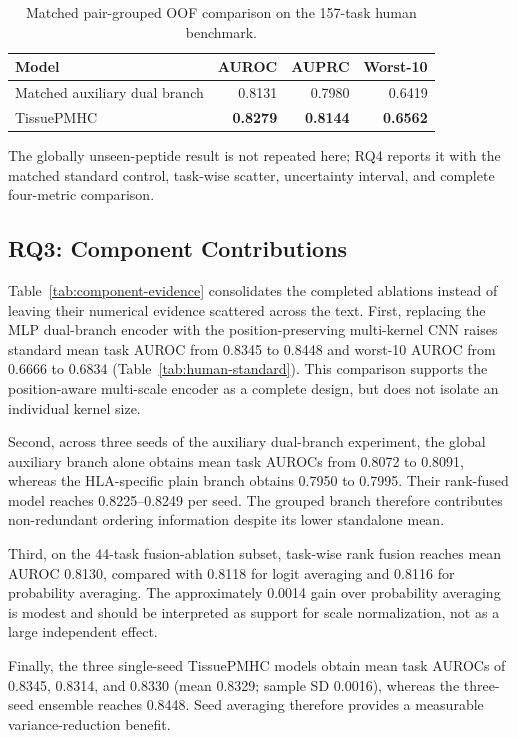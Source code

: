 \begin{table}[tbp]
\centering
\caption{Matched pair-grouped OOF comparison on the 157-task human benchmark.}
\label{tab:human-matched-oof}
\small
\begin{tabular}{lrrr}
\toprule
Model & AUROC & AUPRC & Worst-10 \\ 
\midrule
Matched auxiliary dual branch & 0.8131 & 0.7980 & 0.6419 \\ 
TissuePMHC & \textbf{0.8279} & \textbf{0.8144} & \textbf{0.6562} \\ 
\bottomrule
\end{tabular}
\end{table}

The globally unseen-peptide result is not repeated here; RQ4 reports it with the matched standard control, task-wise scatter, uncertainty interval, and complete four-metric comparison.

\subsection{RQ3: Component Contributions}

Table~\ref{tab:component-evidence} consolidates the completed ablations instead of leaving their numerical evidence scattered across the text. First, replacing the MLP dual-branch encoder with the position-preserving multi-kernel CNN raises standard mean task AUROC from 0.8345 to 0.8448 and worst-10 AUROC from 0.6666 to 0.6834 (Table~\ref{tab:human-standard}). This comparison supports the position-aware multi-scale encoder as a complete design, but does not isolate an individual kernel size.

Second, across three seeds of the auxiliary dual-branch experiment, the global auxiliary branch alone obtains mean task AUROCs from 0.8072 to 0.8091, whereas the HLA-specific plain branch obtains 0.7950 to 0.7995. Their rank-fused model reaches 0.8225--0.8249 per seed. The grouped branch therefore contributes non-redundant ordering information despite its lower standalone mean.

Third, on the 44-task fusion-ablation subset, task-wise rank fusion reaches mean AUROC 0.8130, compared with 0.8118 for logit averaging and 0.8116 for probability averaging. The approximately 0.0014 gain over probability averaging is modest and should be interpreted as support for scale normalization, not as a large independent effect.

Finally, the three single-seed TissuePMHC models obtain mean task AUROCs of 0.8345, 0.8314, and 0.8330 (mean 0.8329; sample SD 0.0016), whereas the three-seed ensemble reaches 0.8448. Seed averaging therefore provides a measurable variance-reduction benefit.

